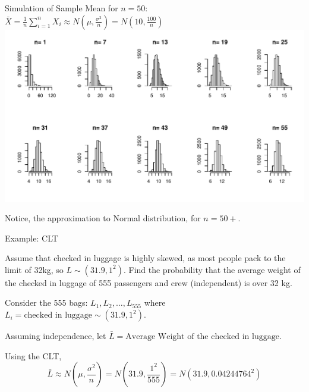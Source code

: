 \documentclass[t,xcolor=pdftex,dvipsnames,table]{beamer}\usepackage[]{graphicx}\usepackage[]{color}
\makeatletter
\def\maxwidth{ %
  \ifdim\Gin@nat@width>\linewidth
    \linewidth
  \else
    \Gin@nat@width
  \fi
}
\newenvironment{knitrout}{}{} %
\makeatother
\begin{document}
\begin{frame}{}

Simulation of Sample Mean for $n=50$: $\bar{X} = \frac{1}{n} \sum_{i=1}^{n} X_{i}  \approx N(\mu, \frac{\sigma^2}{n}) = N(10,\frac{100}{n})$  \\

\begin{knitrout}
\color{fgcolor}
\includegraphics[width=\maxwidth]{figure/unnamed-chunk-116-1} 

\end{knitrout}

Notice, the approximation to Normal distribution, for $n=50+$.
\end{frame}

\begin{frame}[fragile]{}

\begin{block}{Example: CLT}

Assume that checked in luggage is highly skewed, as most people pack to the limit of 32kg, so $L \sim (31.9, 1^2)$.
Find the probability that the average weight of the checked in luggage of 555 passengers and crew (independent) is over 32 kg.
\end{block}

\vspace{.5cm}
Consider the 555 bags: $L_{1}, L_{2}, \ldots, L_{555}$ where $L_{i} = \mbox{checked in luggage} \sim (31.9, 1^2)$.

\vspace{.5cm}
Assuming independence, let $\bar{L} = \mbox{Average Weight of the checked in luggage}$.

\vspace{.5cm}
Using the CLT,
\[ \bar{L} \approx  N(\mu,\frac{\sigma^2}{n}) = N(31.9, \frac{1^2}{555} ) = N(31.9, 0.04244764^2) \]

\end{frame}
\end{document}
